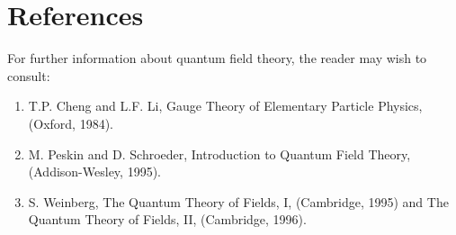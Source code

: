 \documentclass[aps,epsf]{revtex4}
\begin{document}
\section*{References}
For further information about quantum field theory, the
reader may wish to consult:

\begin{enumerate}

\item T.P. Cheng and L.F. Li, Gauge Theory of Elementary Particle
Physics, (Oxford, 1984).

\item M. Peskin and D. Schroeder,  Introduction to Quantum Field
Theory, (Addison-Wesley, 1995).

\item S. Weinberg,  The Quantum Theory of Fields, I, (Cambridge,
1995) and  The Quantum Theory of Fields, II, (Cambridge, 1996).

\end{enumerate}
\end{document}
